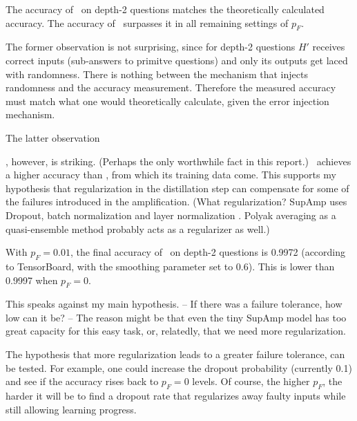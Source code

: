 \documentclass{farlamp}
\begin{document}
\hypertarget{interesting}{}
\begin{LCRow}
\end{LCRow}

\Obs The accuracy of \AmpHp\ on depth-2 questions matches the theoretically
calculated accuracy. The accuracy of \Xpa\ surpasses it in all remaining settings
of $p_F$.

\Disc The former observation is not surprising, since for depth-2 questions $H'$
receives correct inputs (sub-answers to primitve questions) and only its outputs
get laced with randomness. There is nothing between the mechanism that injects
randomness and the accuracy measurement. Therefore the measured accuracy must
match what one would theoretically calculate, given the error injection
mechanism.

\hypertarget{bla}{The latter observation}, however, is striking.
(Perhaps the only worthwhile fact in this report.) \Xpa\ achieves a higher
accuracy than \AmpHp, from which its training data come. This supports my
hypothesis that regularization in the distillation step can compensate for some
of the failures introduced in the amplification. (What regularization? SupAmp
uses Dropout, batch normalization and layer normalization \parencite{CSASupAmp}.
Polyak averaging as a quasi-ensemble method \parencite{BrowPolyakAvg} probably
acts as a regularizer as well.)


\begin{LCRow}
\end{LCRow}

\Obs With $p_F = 0.01$, the final accuracy of \Xpa\ on depth-2 questions is
0.9972 (according to TensorBoard, with the smoothing parameter set to 0.6). This
is lower than 0.9997 when $p_F = 0$.

\Disc This speaks against my main hypothesis. – If there was a failure
tolerance, how low can it be? – The reason might be that even the tiny SupAmp
model has too great capacity for this easy task, or, relatedly, that we need
more regularization.

The hypothesis that more regularization leads to a greater failure tolerance,
can be tested. \TODO For example, one could increase the dropout probability
(currently 0.1) and see if the accuracy rises back to $p_F = 0$ levels. Of
course, the higher $p_F$, the harder it will be to find a dropout rate that
regularizes away faulty inputs while still allowing learning progress.
\end{document}
